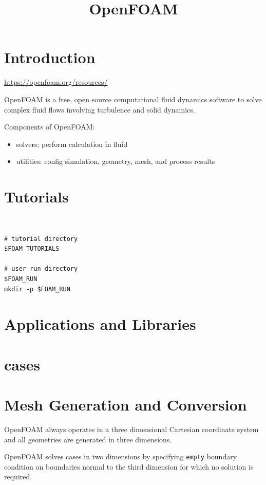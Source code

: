 \documentclass{blog}
\title{OpenFOAM}
\begin{document}
\maketitle
\tableofcontents
\section{Introduction}

\begin{definition}[openfoam]
    \url{https://openfoam.org/resources/}

    OpenFOAM is a free, open source computational fluid dynamics software
    to solve complex fluid flows involving turbulence and solid dynamics.
\end{definition}

Components of OpenFOAM:
\begin{itemize}
    \item solvers: perform calculation in fluid
    \item utilities: config simulation, geometry, mesh, and process results
\end{itemize}

\section{Tutorials}
\begin{definition}[environment]~
    \begin{verbatim}
# tutorial directory
$FOAM_TUTORIALS

# user run directory
$FOAM_RUN
mkdir -p $FOAM_RUN
\end{verbatim}
\end{definition}

\section{Applications and Libraries}

\section{cases}

\section{Mesh Generation and Conversion}
\begin{definition}[mesh]
    OpenFOAM always operates in a three dimensional Cartesian coordinate system
    and all geometries are generated in three dimensions.

    OpenFOAM solves cases in two dimensions by specifying \verb|empty| boundary condition
    on boundaries normal to the third dimension for which no solution is required.
\end{definition}
\end{document}

